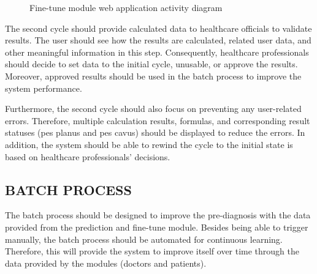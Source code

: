 \begin{figure}[htbp]
\centering
{}
\caption{Fine-tune module web application activity diagram}
\label{fig:FineTuneModuleWebApplicationSequenceDiagram}
\end{figure}

The second cycle should provide calculated data to healthcare officials to validate results. The user should see how the results are calculated, related user data, and other meaningful information in this step. Consequently, healthcare professionals should decide to set data to the initial cycle, unusable, or approve the results. Moreover, approved results should be used in the batch process to improve the system performance. 

Furthermore, the second cycle should also focus on preventing any user-related errors. Therefore, multiple calculation results, formulas, and corresponding result statuses (pes planus and pes cavus) should be displayed to reduce the errors. In addition, the system should be able to rewind the cycle to the initial state is based on healthcare professionals' decisions.

\subsection{ BATCH PROCESS }

The batch process should be designed to improve the pre-diagnosis with the data provided from the prediction and fine-tune module. Besides being able to trigger manually, the batch process should be automated for continuous learning. Therefore, this will provide the system to improve itself over time through the data provided by the modules (doctors and patients). 

